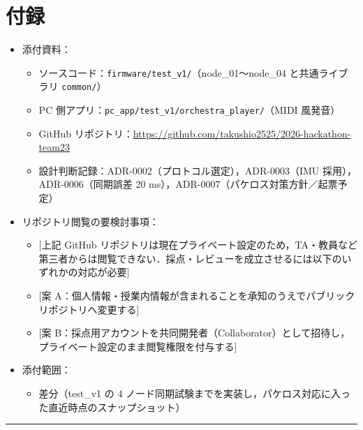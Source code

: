 \documentclass[uplatex,dvipdfmx,a4paper,11pt]{jsarticle}
\newcommand{\sectionrule}{\par\medskip\noindent\rule{\linewidth}{0.6pt}\par\medskip}
\begin{document}
\section{付録}

\begin{itemize}
  \item 添付資料：
    \begin{itemize}
      \item ソースコード：\texttt{firmware/test\_v1/}（node\_01〜node\_04 と共通ライブラリ \texttt{common/}）
      \item PC 側アプリ：\texttt{pc\_app/test\_v1/orchestra\_player/}（MIDI 風発音）
      \item GitHub リポジトリ：\url{https://github.com/takushio2525/2026-hackathon-team23}
      \item 設計判断記録：ADR-0002（プロトコル選定），ADR-0003（IMU 採用），ADR-0006（同期誤差 20 ms），ADR-0007（パケロス対策方針／起票予定）
    \end{itemize}
  \item リポジトリ閲覧の要検討事項：
    \begin{itemize}
      \item {}[上記 GitHub リポジトリは現在プライベート設定のため，TA・教員など第三者からは閲覧できない．採点・レビューを成立させるには以下のいずれかの対応が必要]
      \item {}[案 A：個人情報・授業内情報が含まれることを承知のうえでパブリックリポジトリへ変更する]
      \item {}[案 B：採点用アカウントを共同開発者（Collaborator）として招待し，プライベート設定のまま閲覧権限を付与する]
    \end{itemize}
  \item 添付範囲：
    \begin{itemize}
      \item 差分（test\_v1 の 4 ノード同期試験までを実装し，パケロス対応に入った直近時点のスナップショット）
    \end{itemize}
\end{itemize}

\sectionrule
\end{document}
